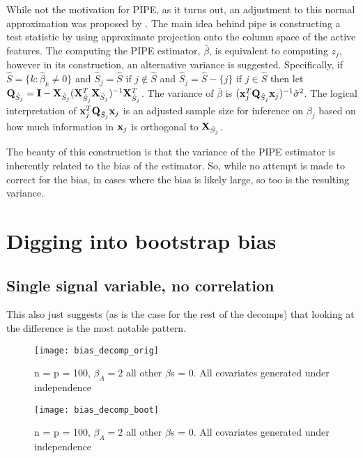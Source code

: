 While not the motivation for PIPE, as it turns out, an adjustment to this normal approximation was proposed by . The main idea behind pipe is constructing a test statistic by using approximate projection onto the column space of the active features. The computing the PIPE estimator, $\bar{\beta}$, is equivalent to computing $z_j$, however in its construction, an alternative variance is suggested. Specifically, if $\hat{S} = \lbrace k: \hat{\beta}_k \neq  0 \rbrace$ and $\hat{S}_j = \hat{S} \text{ if } j \notin \hat{S}$ and $\hat{S}_j = \hat{S} - \lbrace j \rbrace \text{ if } j \in \hat{S}$  then let $\mathbf{Q}_{\hat{S}_j} = \mathbf{I} - \mathbf{X}_{\hat{S}_j}(\mathbf{X}_{\hat{S}_j}^T \mathbf{X}_{\hat{S}_j})^{-1} \mathbf{X}_{\hat{S}_j}^T$. The variance of $\bar{\beta}$ is $(\mathbf{x}_j^T \mathbf{Q}_{\hat{S}_j} \mathbf{x}_j)^{-1}\hat{\sigma}^2$. The logical interpretation of $\mathbf{x}_j^T \mathbf{Q}_{\hat{S}_j} \mathbf{x}_j$ is an adjusted sample size for inference on $\beta_j$ based on how much information in $\mathbf{x}_j$ is orthogonal to $\mathbf{X}_{\hat{S}_j}$. 

The beauty of this construction is that the variance of the PIPE estimator is inherently related to the bias of the estimator. So, while no attempt is made to correct for the bias, in cases where the bias is likely large, so too is the resulting variance.

\newpage

\section{Digging into bootstrap bias}

\subsection{Single signal variable, no correlation}

This also just suggests (as is the case for the rest of the decomps) that looking at the difference is the most notable pattern.

\begin{figure}[hbtp]
    \begin{center}
    \texttt{[image: bias\_decomp\_orig]}
    \caption{\label{Fig:bias_decomp_orig} n = p = 100, $\beta_A = 2$ all other $\beta$s = 0. All covariates generated under independence}
    \end{center}
\end{figure}

\begin{figure}[hbtp]
    \begin{center}
    \texttt{[image: bias\_decomp\_boot]}
    \caption{\label{Fig:bias_decomp_boot} n = p = 100, $\beta_A = 2$ all other $\beta$s = 0. All covariates generated under independence}
    \end{center}
\end{figure}

